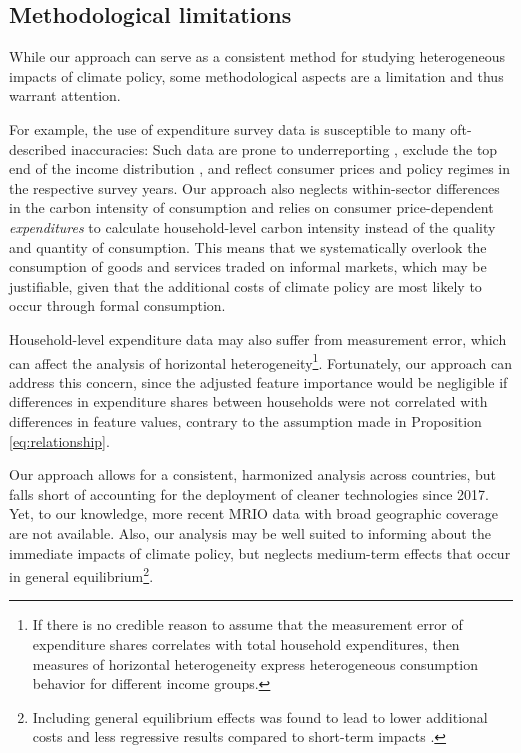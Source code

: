 \documentclass[12pt, a4paper]{article}
\begin{document}
\subsection{Methodological limitations}

While our approach can serve as a consistent method for studying heterogeneous impacts of climate policy, some methodological aspects are a limitation and thus warrant attention.

For example, the use of expenditure survey data is susceptible to many oft-described inaccuracies: Such data are prone to underreporting \autocite{Meyer.2015}, exclude the top end of the income distribution \autocite{Blanchet.2022}, and reflect consumer prices and policy regimes in the respective survey years. Our approach also neglects within-sector differences in the carbon intensity of consumption and relies on consumer price-dependent \textit{expenditures} to calculate household-level carbon intensity instead of the quality and quantity of consumption. This means that we systematically overlook the consumption of goods and services traded on informal markets, which may be justifiable, given that the additional costs of climate policy are most likely to occur through formal consumption.

Household-level expenditure data may also suffer from measurement error, which can affect the analysis of horizontal heterogeneity\footnote{If there is no credible reason to assume that the measurement error of expenditure shares correlates with total household expenditures, then measures of horizontal heterogeneity express heterogeneous consumption behavior for different income groups.}. Fortunately, our approach can address this concern, since the adjusted feature importance would be negligible if differences in expenditure shares between households were not correlated with differences in feature values, contrary to the assumption made in Proposition \ref{eq:relationship}.

Our approach allows for a consistent, harmonized analysis across countries, but falls short of accounting for the deployment of cleaner technologies since 2017. Yet, to our knowledge, more recent MRIO data with broad geographic coverage are not available. Also, our analysis may be well suited to informing about the immediate impacts of climate policy, but neglects medium-term effects that occur in general equilibrium\footnote{Including general equilibrium effects was found to lead to lower additional costs and less regressive results compared to short-term impacts \autocite{Ohlendorf.2021,Drupp.2024}.}. 
\end{document}
